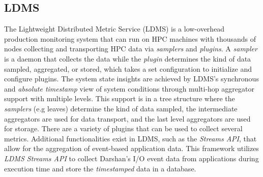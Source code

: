 \subsection{LDMS}
The Lightweight Distributed Metric Service (LDMS) is a low-overhead production monitoring system that can run on HPC machines with thousands of nodes collecting and transporting HPC data via \emph{samplers} and \emph{plugins}. A \emph{sampler} is a daemon that collects the data while the \emph{plugin} determines the kind of data sampled, aggregated, or stored, which takes a set configuration to initialize and configure plugins. 
The system state insights are achieved by LDMS's synchronous and \emph{absolute timestamp} view of system conditions through multi-hop aggregator support with multiple levels. This support is in a tree structure where the \emph{samplers} (e.g leaves) determine the kind of data sampled, the intermediate aggregators are used for data transport, and the last level aggregators are used for storage. There are a variety of plugins that can be used to collect several metrics.
Additional functionalities exist in LDMS, such as the \emph{Streams API}, that allow for the aggregation of event-based application data. This framework utilizes \emph{LDMS Streams API} to collect Darshan's I/O event data from applications during execution time and store the \emph{timestamped} data in a database.
